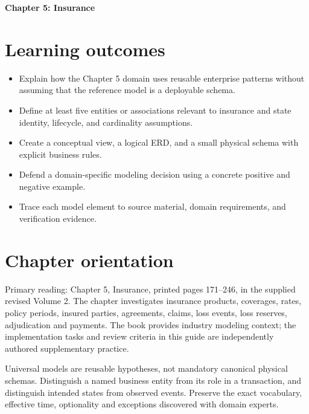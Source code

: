 \documentclass[11pt,letterpaper]{article}
\begin{document}
\begin{center}
{\LARGE\bfseries\color{navy} Chapter 5: Insurance}\par
\vspace{0.25em}{\large Study guide | concept, critique, design, verify}\par
{}
\end{center}
\vspace{0.8em}
\section{Learning outcomes}
\begin{itemize}
\item Explain how the Chapter 5 domain uses reusable enterprise patterns without assuming that the reference model is a deployable schema.
\item Define at least five entities or associations relevant to insurance and state identity, lifecycle, and cardinality assumptions.
\item Create a conceptual view, a logical ERD, and a small physical schema with explicit business rules.
\item Defend a domain-specific modeling decision using a concrete positive and negative example.
\item Trace each model element to source material, domain requirements, and verification evidence.
\end{itemize}

\section{Chapter orientation}
Primary reading: Chapter 5, Insurance, printed pages 171--246, in the supplied revised Volume 2. The chapter investigates insurance products, coverages, rates, policy periods, insured parties, agreements, claims, loss events, loss reserves, adjudication and payments. The book provides industry modeling context; the implementation tasks and review criteria in this guide are independently authored supplementary practice.

Universal models are reusable hypotheses, not mandatory canonical physical schemas. Distinguish a named business entity from its role in a transaction, and distinguish intended states from observed events. Preserve the exact vocabulary, effective time, optionality and exceptions discovered with domain experts.
\end{document}
